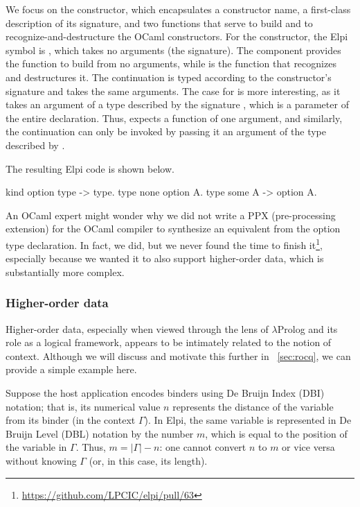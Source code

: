\documentclass[a4paper, 11pt]{book}
\begin{document}
\noindent
We focus on the  constructor, which encapsulates a constructor name,
a first-class description of its signature, and two functions that serve to
build and to recognize-and-destructure the OCaml constructors. For the
 constructor, the Elpi symbol is , which takes no
arguments (the  signature). The  component provides the
function to build  from no arguments, while  is the
function that recognizes and destructures it. The  continuation is
typed according to the constructor's signature and takes the same arguments.
The case for  is more interesting, as it takes an argument of a
type described by the signature , which is a parameter of the entire
declaration. Thus,  expects a function of one argument, and
similarly, the continuation  can only be invoked by passing it an
argument of the type described by .

The resulting Elpi code is shown below.

\begin{elpicode}
kind option type -> type.
type none option A.
type some A -> option A.
\end{elpicode}

An OCaml expert might wonder why we did not write a PPX (pre-processing
extension) for the OCaml compiler to synthesize an equivalent
 from the option type declaration. In fact, we did, but we
never found the time to finish it\footnote{\url{https://github.com/LPCIC/elpi/pull/63}},
especially because we wanted it to also support higher-order data, which is
substantially more complex.


\subsubsection{Higher-order data}\label{sec:hodata}


Higher-order data, especially when viewed through the lens of $\lambda$Prolog
and its role as a logical framework, appears to be intimately related to the
notion of context. Although we will discuss and motivate this further in
~\cref{sec:rocq}, we can provide a simple example here.

Suppose the host application encodes binders using De Bruijn Index (DBI)
notation; that is, its numerical value $n$ represents the distance of the
variable from its binder (in the context $\Gamma$). In Elpi, the same variable
is represented in De Bruijn Level (DBL) notation by the number $m$, which is
equal to the position of the variable in $\Gamma$. Thus, $m = |\Gamma| - n$:
one cannot convert $n$ to $m$ or vice versa without knowing $\Gamma$ (or, in
this case, its length).
\end{document}
